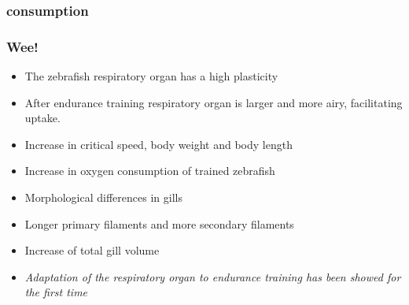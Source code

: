 \documentclass[aspectratio=169, 10pt]{beamer}
\begin{document}
\begin{frame}[label=current]
	\frametitle{ consumption}
	
\end{frame}

\begin{frame}[label=current]
	\frametitle{Wee!}
	\begin{itemize}
		\item The zebrafish respiratory organ has a high plasticity
		\item After endurance training respiratory organ is larger and more airy, facilitating  uptake.
		\item Increase in critical speed, body weight and body length
		\item Increase in oxygen consumption of trained zebrafish
		\item Morphological differences in gills
		\item Longer primary filaments and more secondary filaments
		\item Increase of total gill volume
		\pause
		\item \emph{Adaptation of the respiratory organ to endurance training has been showed for the first time}
	\end{itemize}
\end{frame}
\end{document}
